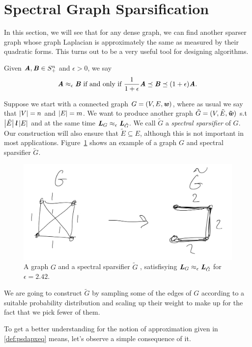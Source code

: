 \section{Spectral Graph Sparsification}

\newcommand\Gtil{\tilde{G}}
\newcommand\Etil{\tilde{E}}

In this section, we will see that for any dense graph, we can find
another sparser graph whose graph Laplacian is approximately the same
as measured by their quadratic forms.
This turns out to be a very useful tool for designing algorithms.

\begin{definition}
  \label{def:psdapxeq}
  Given  $\boldsymbol{\mathit{A}},\boldsymbol{\mathit{B}} \in S_+^n$ and $\epsilon > 0$, we say
  \[
    \boldsymbol{\mathit{A}} \approx_{\epsilon} \boldsymbol{\mathit{B}} \text{ if and only if }
    \frac{1}{1+\epsilon} \boldsymbol{\mathit{A}} \preceq \boldsymbol{\mathit{B}} \preceq (1+\epsilon) \boldsymbol{\mathit{A}}
    .
    \]
\end{definition}

Suppose we start with a connected graph $G = (V,E,\boldsymbol{\mathit{w}})$, where as usual we say that $\left|V \right|
= n$ and $\left|E \right| = m$.
We want to produce another graph $\Gtil = (V,\Etil,\wwtil)$ s.t
$\abs{\Etil} \muchl \abs{E}$ and at the same time $\LL_{G}
\approx_{\epsilon} \LL_{\Gtil}$.
We call $\Gtil$ a \emph{spectral sparsifier} of $G$.
Our construction will also ensure that $\Etil \subseteq E$, although
this is not important in most applications.
Figure~\ref{fig:gvsgtil} shows an example of a graph $G$ and
spectral sparsifier $\Gtil$.

\begin{figure}[h]
  \centering
  \includegraphics[width=0.6
  \textwidth]{fig/lecture8_gtil}
\caption{A graph $G$ and a spectral sparsifier $\Gtil$
,
  satisfisying
 $\LL_{G} \approx_{\epsilon} \LL_{\Gtil}$ for $\epsilon = 2.42$.
}
\label{fig:gvsgtil}
\end{figure}

We are going to construct $\Gtil$ by sampling some of the edges of $G$
according to a suitable probability distribution and scaling up their weight
to make up for the fact that we pick fewer of them.

To get a better understanding for the notion of approximation given in
\ref{def:psdapxeq} means, let's observe a simple consequence of it.

